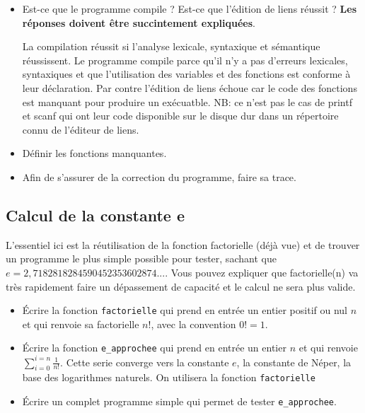 \begin{itemize}
\item Est-ce que le programme compile ? Est-ce que l'édition de liens
  réussit ? \textbf{Les réponses doivent être succintement expliquées}.
\begin{correction}
La compilation réussit si l'analyse lexicale, syntaxique et sémantique réussissent. Le programme compile parce qu'il n'y a pas d'erreurs lexicales, syntaxiques et que l'utilisation des variables et des fonctions est conforme à leur déclaration. Par contre l'édition de liens échoue car le code des fonctions est manquant pour produire un exécuatble. NB: ce n'est pas le cas de printf et scanf qui ont leur code disponible sur le disque dur dans un répertoire connu de l'éditeur de liens.       
\end{correction}
\item Définir les fonctions manquantes.
\begin{correction}
{
\footnotesize
{}
}
\end{correction}
\item Afin de s'assurer de la correction du programme, faire sa trace.
\end{itemize}

\subsection{Calcul de la constante e}
\begin{correction}
L'essentiel ici est la réutilisation de la fonction factorielle (déjà vue) et de trouver un programme le plus simple possible pour tester, sachant que $e = 2,718 281 828 459 045 235 360 287 4...$. Vous pouvez expliquer que factorielle(n) va très rapidement faire un dépassement de capacité et le calcul ne sera plus valide.
\end{correction}
\begin{itemize}
\item Écrire la fonction \verb|factorielle| qui prend en entrée un entier positif ou nul $n$ et qui renvoie sa factorielle $n!$, avec la convention $0! = 1$.
\item Écrire la fonction \verb|e_approchee| qui prend en entrée un entier $n$ et qui renvoie $\sum_{i=0}^{i=n} \frac{1}{n!}$. Cette serie converge vers la constante $e$, la constante de Néper, la base des logarithmes naturels. On utilisera la fonction \verb|factorielle|
\item Écrire un complet programme simple qui permet de tester \verb|e_approchee|.
\end{itemize}
\begin{correction}
{
\footnotesize
{}
}
\end{correction}


